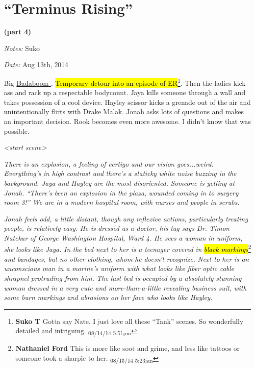 \setcounter{chapter}{ 29 }
\chapter{\textbf{``Terminus Rising''} }




\begin{center}
 {\LARGE \textbf{(part 4)} } 
\end{center}




\textit{Notes:} Suko

\textit{Date:} Aug 13th, 2014



Big \underline{  {\color[RGB]{17,85,204}Badaboom}  }.  \hl{Temporary detour into an episode of ER}\footnote{\textbf{Suko T }Gotta say Nate, I just love all these ``Tank'' scenes.  So wonderfully detailed and intriguing. \textsubscript{08/14/14 5:51pm}}.  Then the ladies kick ass and rack up a respectable bodycount.   Jaya kills someone through a wall and takes possession of a cool device.  Hayley scissor kicks a grenade out of the air and unintentionally flirts with Drake Malak.  Jonah asks lots of questions and makes an important decision.  Rook becomes even more awesome.  I didn't know that was possible.



\noindent\hrulefill





\textit{\textless start scene\textgreater }



\textit{There is an explosion, a feeling of vertigo and our vision goes...weird.  Everything's in high contrast and there's a staticky white noise buzzing in the background.  Jaya and Hayley are the most disoriented.  Someone is yelling at Jonah.  ``There's been an explosion in the plaza, wounded coming in to surgery room 3!''  We are in a modern hospital room, with nurses and people in scrubs.}



\textit{Jonah feels odd, a little distant, though any reflexive actions, particularly treating people, is relatively easy.  He is dressed as a doctor, his tag says Dr. Timon Natekar of George Washington Hospital, Ward 4.  He sees a woman in uniform, she looks like Jaya.  In the bed next to her is a teenager covered in }\textit{\hl{black markings}}\footnote{\textbf{Nathaniel Ford }This is more like soot and grime, and less like tattoos or someone took a sharpie to her. \textsubscript{08/15/14 5:23am}}\textit{ and bandages, but no other clothing, whom he doesn't recognize.  Next to her is an unconscious man in a marine's uniform with what looks like fiber optic cable shrapnel protruding from him.  The last bed is occupied by a absolutely stunning woman dressed in a very cute and more-than-a-little revealing business suit, with some burn markings and abrasions on her face who looks like Hayley.}



